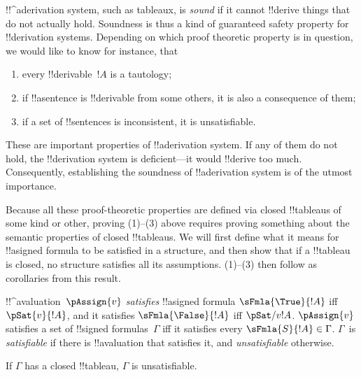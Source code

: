      

\begin{explain}
!!^a{derivation} system, such as tableaux, is \emph{sound}
if it cannot !!{derive} things that do not actually hold.  Soundness is
thus a kind of guaranteed safety property for !!{derivation} systems.
Depending on which proof theoretic property is in question, we would
like to know for instance, that
\begin{enumerate}
\item every !!{derivable}~$!A$ is a tautology;
\item if !!a{sentence} is !!{derivable} from some others, it is also a
  consequence of them;
\item if a set of !!{sentence}s is inconsistent, it is unsatisfiable.
\end{enumerate}
These are important properties of !!a{derivation} system.  If any of them do
not hold, the !!{derivation} system is deficient---it would !!{derive} too much.
Consequently, establishing the soundness of !!a{derivation} system is of the
utmost importance.

Because all these proof-theoretic properties are defined via closed
!!{tableau}s of some kind or other, proving (1)--(3) above requires
proving something about the semantic properties of closed
!!{tableau}s.  We will first define what it means for !!a{signed
  formula} to be satisfied in a structure, and then show that if a
!!{tableau} is closed, no structure satisfies all its assumptions.
(1)--(3) then follow as corollaries from this result.
\end{explain}

\begin{defn}
!!^a{valuation}~$\pAssign{v}$
\emph{satisfies} !!a{signed formula} $\sFmla{\True}{!A}$ iff
$\pSat{v}{!A}$, and it satisfies
$\sFmla{\False}{!A}$ iff
$\pSat/{v}{!A}$. $\pAssign{v}$
satisfies a set of !!{signed formula}s~$\Gamma$ iff it satisfies every
$\sFmla{S}{!A} \in \Gamma$. $\Gamma$~is \emph{satisfiable} if there is
!!a{valuation} that satisfies it, and
\emph{unsatisfiable} otherwise.
\end{defn}

\begin{thm}[Soundness]
  If $\Gamma$ has a closed !!{tableau}, $\Gamma$ is unsatisfiable.
\end{thm}

